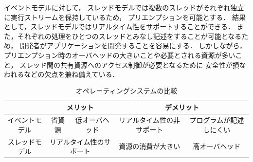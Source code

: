 イベントモデルに対して，
スレッドモデルでは複数のスレッドがそれぞれ独立に実行ストリームを保持しているため，
プリエンプションを可能とする．
結果として，スレッドモデルではリアルタイム性をサポートすることができる．
また，それぞれの処理をひとつのスレッドとみなし記述をすることが可能となるため，
開発者がアプリケーションを開発することを容易にする．
しかしながら，プリエンプション時のオーバヘッドの大きいことや必要とされる資源が多いこと，
スレッド間の共有資源へのアクセス制御が必要となるために
安全性が損なわれるなどの欠点を兼ね備えている．


%



\begin{table}[htb]
  \centering
  \caption{オペレーティングシステムの比較}
  \begin{tabular}{|c||c|c|c|c|} \hline
    \backslashbox{}{} & \multicolumn{2}{|c|}{メリット} & \multicolumn{2}{|c|}{デメリット} \\ \hline \hline
    イベントモデル & 省資源 & 低オーバヘッド & リアルタイム性の非サポート & プログラムが記述しにくい \\ \hline
    スレッドモデル & \multicolumn{2}{|c|}{リアルタイム性のサポート} & 資源の消費が大きい & 高オーバヘッド \\ \hline
  \end{tabular}
  \label{tab:merit_and_demerit}
\end{table}



%
%
%



